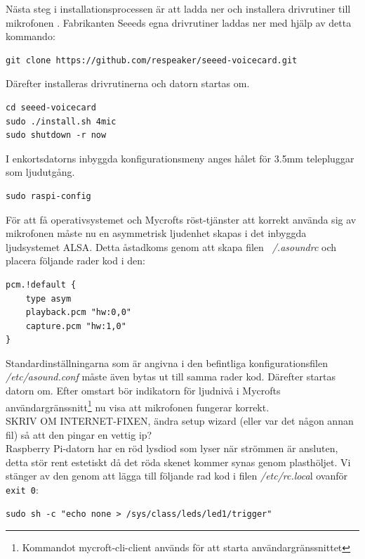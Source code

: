 Nästa steg i installationsprocessen är att ladda ner och installera drivrutiner till mikrofonen \cite{seeeds_documentation, reaspeker-installation}. Fabrikanten Seeeds egna drivrutiner laddas ner med hjälp av detta kommando:
\begin{verbatim}
git clone https://github.com/respeaker/seeed-voicecard.git
\end{verbatim}
Därefter installeras drivrutinerna och datorn startas om.
\begin{verbatim}
cd seeed-voicecard
sudo ./install.sh 4mic
sudo shutdown -r now
\end{verbatim}
I enkortsdatorns inbyggda konfigurationsmeny anges hålet för 3.5mm telepluggar som ljudutgång. 
\begin{verbatim}
sudo raspi-config
\end{verbatim}

För att få operativsystemet och Mycrofts röst-tjänster att korrekt använda sig av mikrofonen måste nu en asymmetrisk ljudenhet skapas i det inbyggda ljudsystemet ALSA. Detta åstadkoms genom att skapa filen \textit{~/.asoundrc} och placera följande rader kod i den:
\begin{verbatim}
pcm.!default {
    type asym
    playback.pcm "hw:0,0"
    capture.pcm "hw:1,0"
}
\end{verbatim}

Standardinställningarna som är angivna i den befintliga konfigurationsfilen \textit{/etc/asound.conf} måste även bytas ut till samma rader kod. Därefter startas datorn om. Efter omstart bör indikatorn för ljudnivå i Mycrofts användargränssnitt\footnote{Kommandot mycroft-cli-client används för att starta användargränssnittet} nu visa att mikrofonen fungerar korrekt. 
\\
SKRIV OM INTERNET-FIXEN, ändra setup wizard (eller var det någon annan fil) så att den pingar en vettig ip?
\\
Raspberry Pi-datorn har en röd lysdiod som lyser när strömmen är ansluten, detta stör rent estetiskt då det röda skenet kommer synas genom plasthöljet. Vi stänger av den genom att lägga till följande rad kod i filen \textit{/etc/rc.loca}l ovanför {\texttt{exit 0}}: 
\begin{verbatim}
sudo sh -c "echo none > /sys/class/leds/led1/trigger"
\end{verbatim}

